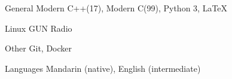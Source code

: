 

\begin{cvskills}

  \cvskill
    {General} %
    {Modern C++(17), Modern C(99), Python 3, LaTeX} %

  \cvskill
    {Linux} %
    {GUN Radio} %

  \cvskill
    {Other} %
    {Git, Docker} %

  \cvskill
    {Languages} %
    {Mandarin (native), English (intermediate)} %
\end{cvskills}
